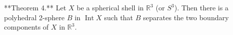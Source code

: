 **Theorem 4.** Let $X$ be a spherical shell in $\mathbb{R}^3$ (or $S^3$). Then there is a polyhedral 2-sphere $B$ in $\operatorname{Int} X$ such that $B$ separates the two boundary components of $X$ in $\mathbb{R}^3$.
